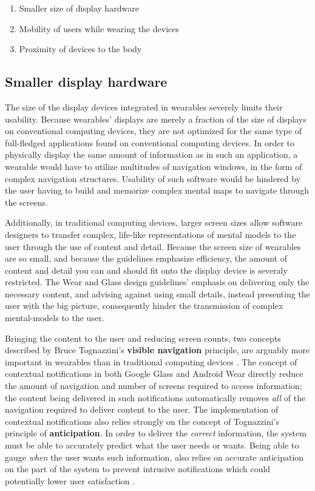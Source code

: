 \documentclass[12pt]{article}
\begin{document}
\begin{enumerate}
\item{Smaller size of display hardware}
\item{Mobility of users while wearing the devices}
\item{Proximity of devices to the body}
\end{enumerate}

\subsection{Smaller display hardware}
The size of the display devices integrated in wearables severely limits their usability. Because wearables' displays are merely a fraction of the size of displays on conventional computing devices, they are not optimized for the same type of full-fledged applications found on conventional computing devices. In order to physically display the same amount of information as in such an application, a wearable would have to utilize multitudes of navigation windows, in the form of complex navigation structures. Usability of such software would be hindered by the user having to build and memorize complex mental maps to navigate through the screens.

Additionally, in traditional computing devices, larger screen sizes allow software designers to transfer complex, life-like representations of mental models to the user through the use of content and detail. Because the screen size of wearables are so small, and because the guidelines emphasize efficiency, the amount of content and detail you can and should fit onto the display device is severaly restricted. The Wear and Glass design guidelines' emphasis on delivering only the necessary content, and advising against using small details, instead presenting the user with the big picture, consequently hinder the transmission of complex mental-models to the user.

Bringing the content to the user and reducing screen counts, two concepts described by Bruce Tognazzini's \textbf{visible navigation} principle, are arguably more important in wearables than in traditional computing devices \cite{tog}. The concept of contextual notifications in both Google Glass and Android Wear directly reduce the amount of navigation and number of screens required to access information; the content being delivered in such notifications automatically removes \textit{all} of the navigation required to deliver content to the user. The implementation of contextual notifications also relies strongly on the concept of Tognazzini's principle of \textbf{anticipation}. In order to deliver the \textit{correct} information, the system must be able to accurately predict what the user needs or wants. Being able to gauge \textit{when} the user wants such information, also relies on accurate anticipation on the part of the system to prevent intrusive notifications which could potentially lower user satisfaction \cite{tog}.
\end{document}
